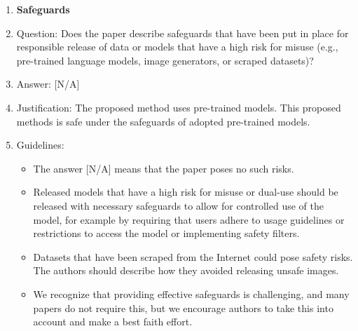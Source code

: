 \documentclass{llmxive}
\providecommand{\answerYes}[1][]{[Yes]#1}
\providecommand{\answerNo}[1][]{[No]#1}
\providecommand{\answerNA}[1][]{[N/A]#1}
\begin{document}
{\begin{enumerate}
\item {\bf Safeguards}
    \item[] Question: Does the paper describe safeguards that have been put in place for responsible release of data or models that have a high risk for misuse (e.g., pre-trained language models, image generators, or scraped datasets)?
    \item[] Answer: \answerNA{} %
    \item[] Justification: The proposed method uses pre-trained models. This proposed methods is safe under the safeguards of adopted pre-trained models.
    \item[] Guidelines:
    \begin{itemize}
        \item The answer \answerNA{} means that the paper poses no such risks.
        \item Released models that have a high risk for misuse or dual-use should be released with necessary safeguards to allow for controlled use of the model, for example by requiring that users adhere to usage guidelines or restrictions to access the model or implementing safety filters. 
        \item Datasets that have been scraped from the Internet could pose safety risks. The authors should describe how they avoided releasing unsafe images.
        \item We recognize that providing effective safeguards is challenging, and many papers do not require this, but we encourage authors to take this into account and make a best faith effort.
    \end{itemize}


\end{enumerate}}
\end{document}
